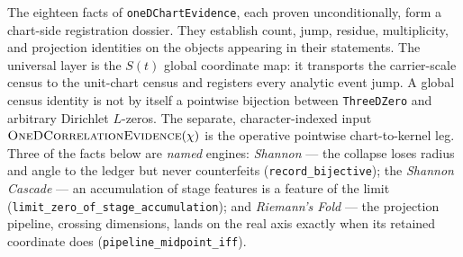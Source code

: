The eighteen facts of \texttt{oneDChartEvidence}, each proven
unconditionally, form a chart-side registration dossier.  They establish
count, jump, residue, multiplicity, and projection identities on the objects
appearing in their statements.  The universal layer is the \(S(t)\) global
coordinate map: it transports the carrier-scale census to the unit-chart
census and registers every analytic event jump.  A global census identity is
not by itself a pointwise bijection between \texttt{ThreeDZero} and arbitrary
Dirichlet \(L\)-zeros.  The separate, character-indexed input
\(\textsc{OneDCorrelationEvidence}(\chi)\) is the operative pointwise
chart-to-kernel leg.
Three of the facts below are \emph{named} engines: \emph{Shannon} --- the collapse loses
radius and angle to the ledger but never counterfeits (\texttt{record\_bijective}); the
\emph{Shannon Cascade} --- an accumulation of stage features is a feature of the limit
(\texttt{limit\_zero\_of\_stage\_accumulation}); and \emph{Riemann's Fold} --- the
projection pipeline, crossing dimensions, lands on the real axis exactly when its retained
coordinate does (\texttt{pipeline\_midpoint\_iff}).

